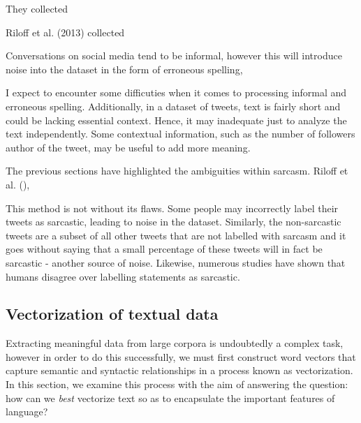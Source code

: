 \documentclass[12pt,a4paper]{article}
\begin{document}
They collected 



Riloff et al. (2013) \cite{riloff2013sarcasm} collected 



Conversations on social media tend to be informal, however this will introduce noise into the dataset in the form of erroneous spelling, 

I expect to encounter some difficuties when it comes to processing informal and erroneous spelling. Additionally, in a dataset of tweets, text is fairly short and could be lacking essential context. Hence, it may inadequate just to analyze the text independently. Some contextual information, such as the number of followers author of the tweet, may be useful to add more meaning.

\noindent The previous sections have highlighted the ambiguities within sarcasm. 
Riloff et al. (), 


This method is not without its flaws. Some people may incorrectly label their tweets as sarcastic, leading to noise in the dataset. Similarly, the non-sarcastic tweets are a subset of all other tweets that are not labelled with sarcasm and it goes without saying that a small percentage of these tweets will in fact be sarcastic - another source of noise.
Likewise, numerous studies have shown that humans disagree over labelling statements as sarcastic.

\vfill

\subsection{Vectorization of textual data}
\noindent Extracting meaningful data from large corpora is undoubtedly a complex task, however in order to do this successfully, we must first construct word vectors that capture semantic and syntactic relationships in a process known as vectorization. In this section, we examine this process with the aim of answering the question: how can we \textit{best} vectorize text so as to encapsulate the important features of language?
\end{document}
